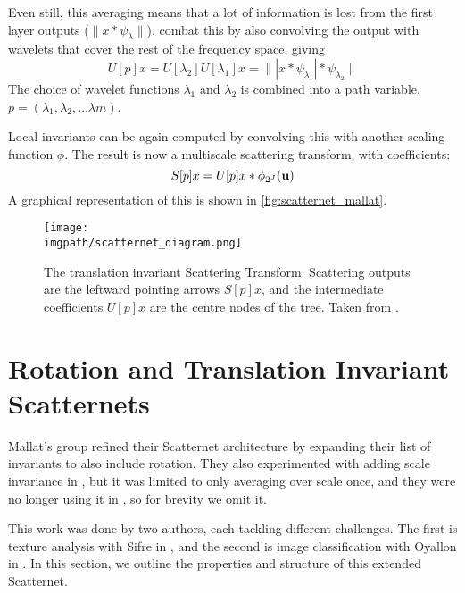   Even still, this averaging means that a lot of information is lost from the
  first layer outputs ($\|x \ast \psi_{\lambda}\|$).
  \citeauthor{bruna_invariant_2013} combat this by also convolving the output
  with wavelets that cover the rest of the frequency space, giving  
  $$U[p]x = U[\lambda_2]U[\lambda_1]x = \| | x \ast \psi_{\lambda_1}| 
    \ast \psi_{\lambda_2} \|$$
  The choice of wavelet functions $\lambda_{1}$ and $\lambda_{2}$ is combined
  into a path variable, $p = (\lambda_1, \lambda_2, \ldots \lambda{m})$.

  Local invariants can be again computed by convolving this with another scaling
  function $\phi$. The result is now a multiscale scattering transform, with
  coefficients:
  $$ S[p]x = U[p]x \ast \phi_{2^J}(\mathbf{u}) $$
  A graphical representation of this is shown in
  \autoref{fig:scatternet_mallat}.

  \begin{figure}
    \centering
      \texttt{[image: \\imgpath/scatternet\_diagram.png]}
      \caption[Translation Invariant Scatternet Layout]
              {The translation invariant Scattering Transform. Scattering outputs
               are the leftward pointing arrows $S[p]x$, and the intermediate 
               coefficients $U[p]x$ are the centre nodes of the tree. Taken
               from \cite{bruna_invariant_2013}.}
      \label{fig:scatternet_mallat}
  \end{figure}


\section{Rotation and Translation Invariant Scatternets}
  Mallat's group refined their Scatternet architecture by expanding their list
  of invariants to also include rotation. They also experimented with adding
  scale invariance in \cite{sifre_rotation_2013}, but it was limited to only
  averaging over scale once, and they were no longer using
  it in \cite{oyallon_deep_2015}, so for brevity we omit it. 
  
  This work was done by two authors, each tackling different
  challenges. The first is texture analysis with Sifre in
  \cite{sifre_combined_2012, sifre_rotation_2013, sifre_rigid-motion_2014,
  sifre_rigid-motion_2014-1}, and the second is image classification with
  Oyallon in \cite{oyallon_generic_2013, oyallon_deep_2015}. In this section,
  we outline the properties and structure of this extended Scatternet.

